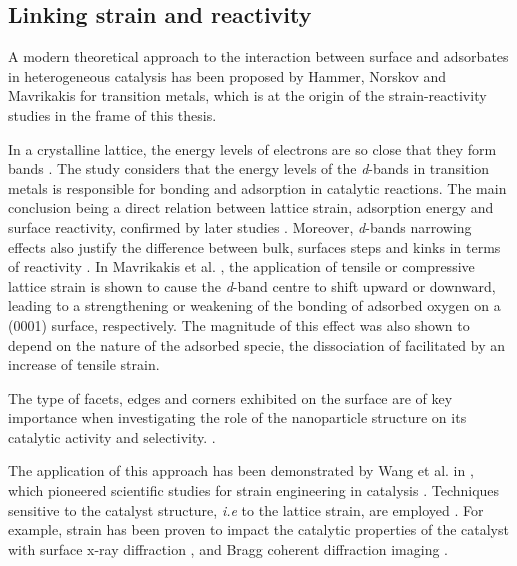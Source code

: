 \subsection{Linking strain and reactivity}

A modern theoretical approach to the interaction between surface and adsorbates in heterogeneous catalysis has been proposed by Hammer, Norskov and Mavrikakis \parencite*{Hammer1995, Mavrikakis1998, Hammer2000} for transition metals, which is at the origin of the strain-reactivity studies in the frame of this thesis.

In a crystalline lattice, the energy levels of electrons are so close that they form bands \parencite{Ashcroft76}.
The study considers that the energy levels of the \textit{d}-bands in transition metals is responsible for bonding and adsorption in catalytic reactions.
The main conclusion being a direct relation between lattice strain, adsorption energy and surface reactivity, confirmed by later studies \parencite{Jakob2001, Kitchin2004, Kibler2005, Gsell1998, Ontaneda2015, Weissmuller2019}.
Moreover, \textit{d}-bands narrowing effects also justify the difference between bulk, surfaces steps and kinks in terms of reactivity \parencite{Haydock1972, Desjonqueres1975, Egelhoff1987, Hammer2006, Khorshidi2018}.
In Mavrikakis et al. \parencite*{Mavrikakis1998}, the application of tensile or compressive lattice strain is shown to cause the \textit{d}-band centre to shift upward or downward, leading to a strengthening or weakening of the bonding of adsorbed oxygen on a  (0001) surface, respectively.
The magnitude of this effect was also shown to depend on the nature of the adsorbed specie, the dissociation of  facilitated by an increase of tensile strain.

The type of facets, edges and corners exhibited on the surface are of key importance when investigating the role of the nanoparticle structure on its catalytic activity and selectivity. \parencite{Abuin2019}.

The application of this approach has been demonstrated by Wang et al. in \cite*{Wang2016}, which pioneered scientific studies for strain engineering in catalysis \parencite{NilssonPingel2018}.
Techniques sensitive to the catalyst structure, \textit{i.e} to the lattice strain, are employed \parencite{Somorjai1991}.
For example, strain has been proven to impact the catalytic properties of the catalyst with surface x-ray diffraction \parencite{Resta2020a}, and Bragg coherent diffraction imaging \parencite{Ulvestad2016, Kim2019, Bjorling2019, Passos2020, Carnis2021a, Carnis2021b, Dupraz2022}.